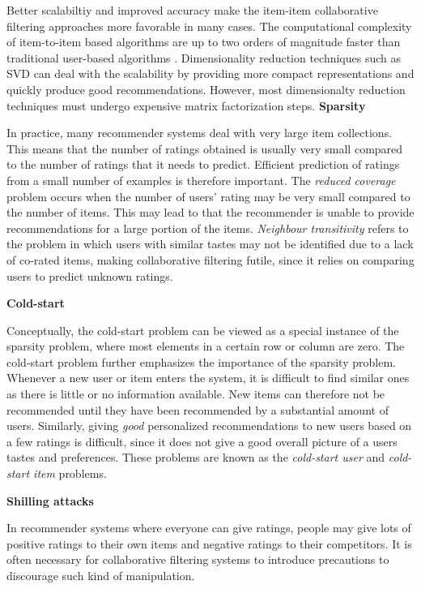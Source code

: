 Better scalabiltiy and improved accuracy make the item-item collaborative filtering approaches more favorable in many cases. The computational complexity of item-to-item based algorithms are up to two orders of magnitude faster than traditional user-based algorithms \cite{Deshpande2004}. Dimensionality reduction techniques such as SVD can deal with the scalability by providing more compact representations and quickly produce good recommendations. However, most dimensionalty reduction techniques must undergo expensive matrix factorization steps.\newline
\textbf{Sparsity}

In practice, many recommender systems deal with very large item collections. This means that the number of ratings obtained is usually very small compared to the number of ratings that it needs to predict. Efficient prediction of ratings from a small number of examples is therefore important. The \emph{reduced coverage} problem occurs when the number of users' rating may be very small compared to the number of items. This may lead to that the recommender is unable to provide recommendations for a large portion of the items. \emph{Neighbour transitivity} refers to the problem in which users with similar tastes may not be identified due to a lack of co-rated items, making collaborative filtering futile, since it relies on comparing users to predict unknown ratings. \linebreak[4]

\textbf{Cold-start}

Conceptually, the cold-start problem can be viewed as a special instance of the sparsity problem, where most elements in a certain row or column are zero. The cold-start problem further emphasizes the importance of the sparsity problem. Whenever a new user or item enters the system, it is difficult to find similar ones as there is little or no information available. New items can therefore not be recommended until they have been recommended by a substantial amount of users. Similarly, giving \emph{good} personalized recommendations to new users based on a few ratings is difficult, since it does not give a good overall picture of a users tastes and preferences. These problems are known as the \emph{cold-start user} and \emph{cold-start item} problems. \linebreak[4]

\textbf{Shilling attacks}

In recommender systems where everyone can give ratings, people may give lots of positive ratings to their own items and negative ratings to their competitors. It is often necessary for collaborative filtering systems to introduce precautions to discourage such kind of manipulation. \linebreak[4]

